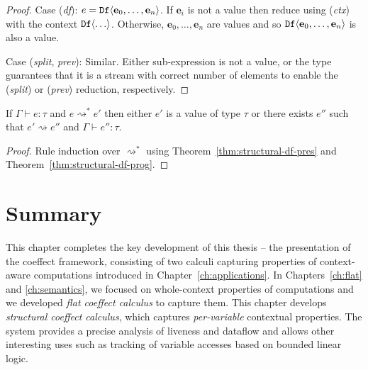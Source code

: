 \begin{proof}
\vspace{0.25em}\noindent\hangindent=0.6cm
Case (\emph{df}): $e = \ident{Df}\langle \textbf{e}_0, \ldots, \textbf{e}_n\rangle$. If $\textbf{e}_i$ is not a value
  then reduce using (\emph{ctx}) with the context $\textnormal{\ttfamily Df}\langle \ldots \rangle$.
  Otherwise, $\textbf{e}_0, \ldots, \textbf{e}_n$ are values and so $\textnormal{\ttfamily Df}\langle \textbf{e}_0, \ldots, \textbf{e}_n\rangle$
  is also a value.

\vspace{0.25em}\noindent\hangindent=0.6cm
Case (\emph{split}, \emph{prev}): Similar. Either sub-expression is not a value, or the type
  guarantees that it is a stream with correct number of elements to enable the (\emph{split})
  or (\emph{prev}) reduction, respectively.
\end{proof}

\begin{theorem}
  If $\Gamma \vdash e : \tau$ and $e \rightsquigarrow^{*} e'$ then either $e'$ is a value of type $\tau$ or
  there exists $e''$ such that $e' \rightsquigarrow e''$ and $\Gamma \vdash e'' : \tau$.
\end{theorem}
\begin{proof}
  Rule induction over $\rightsquigarrow^*$ using Theorem~\ref{thm:structural-df-pres} and Theorem~\ref{thm:structural-df-prog}.
\end{proof}


%
%

\section{Summary}

This chapter completes the key development of this thesis -- the presentation of the coeffect
framework, consisting of two calculi capturing properties of context-aware computations introduced
in Chapter~\ref{ch:applications}. In Chapters~\ref{ch:flat} and \ref{ch:semantics}, we focused on
whole-context properties of computations and we developed \emph{flat coeffect calculus} to capture them.
This chapter develops \emph{structural coeffect calculus}, which captures \emph{per-variable}
contextual properties. The system provides a precise analysis of liveness and dataflow and allows
other interesting uses such as tracking of variable accesses based on bounded linear logic.

